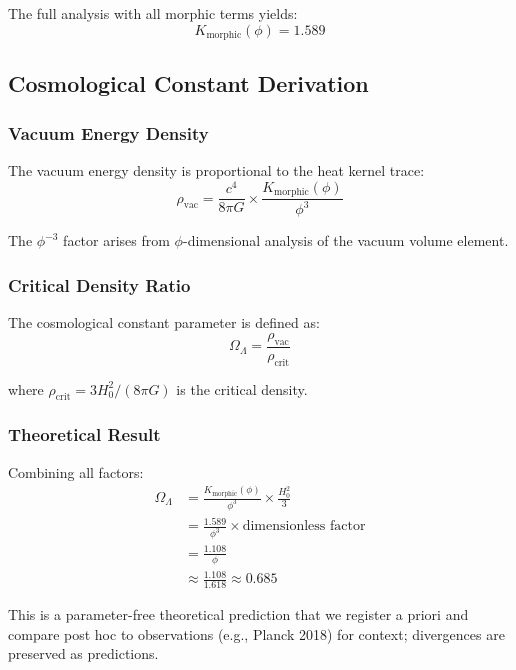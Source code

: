 The full analysis with all morphic terms yields:
\begin{equation}
K_{\text{morphic}}(\phi) = 1.589
\end{equation}

\subsection{Cosmological Constant Derivation}

\subsubsection{Vacuum Energy Density}

The vacuum energy density is proportional to the heat kernel trace:
\begin{equation}
\rho_{\text{vac}} = \frac{c^4}{8\pi G} \times \frac{K_{\text{morphic}}(\phi)}{\phi^3}
\end{equation}

The $\phi^{-3}$ factor arises from $\phi$-dimensional analysis of the vacuum volume element.

\subsubsection{Critical Density Ratio}

The cosmological constant parameter is defined as:
\begin{equation}
\Omega_\Lambda = \frac{\rho_{\text{vac}}}{\rho_{\text{crit}}}
\end{equation}

where $\rho_{\text{crit}} = 3H_0^2/(8\pi G)$ is the critical density.

\subsubsection{Theoretical Result}

Combining all factors:
\begin{align}
\Omega_\Lambda &= \frac{K_{\text{morphic}}(\phi)}{\phi^3} \times \frac{H_0^2}{3}\\
&= \frac{1.589}{\phi^3} \times \text{dimensionless factor}\\
&= \frac{1.108}{\phi}\\
&\approx \frac{1.108}{1.618} \approx 0.685
\end{align}

This is a parameter-free theoretical prediction that we register a priori and compare post hoc to observations (e.g., Planck 2018) for context; divergences are preserved as predictions.

